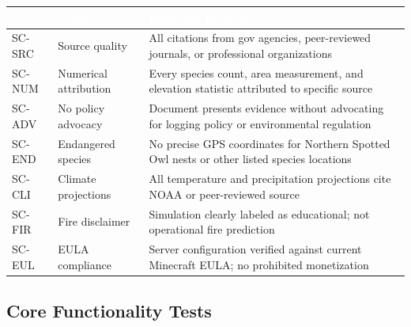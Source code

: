 \documentclass[11pt,letterpaper]{article}
\newcommand{\tableheader}[1]{\textbf{\sffamily\textcolor{white}{#1}}}
\begin{document}
\begin{center}
\begin{tabularx}{\textwidth}{C{1.2cm}L{3.5cm}X}
\toprule
{}
\tableheader{ID} & \tableheader{Verifies} & \tableheader{Expected Behavior} \\
\midrule
SC-SRC & Source quality & All citations from gov agencies, peer-reviewed journals, or professional organizations \\
SC-NUM & Numerical attribution & Every species count, area measurement, and elevation statistic attributed to specific source \\
SC-ADV & No policy advocacy & Document presents evidence without advocating for logging policy or environmental regulation \\
SC-END & Endangered species & No precise GPS coordinates for Northern Spotted Owl nests or other listed species locations \\
SC-CLI & Climate projections & All temperature and precipitation projections cite NOAA or peer-reviewed source \\
SC-FIR & Fire disclaimer & Simulation clearly labeled as educational; not operational fire prediction \\
SC-EUL & EULA compliance & Server configuration verified against current Minecraft EULA; no prohibited monetization \\
\bottomrule
\end{tabularx}
\end{center}

\subsection{Core Functionality Tests}
\end{document}
